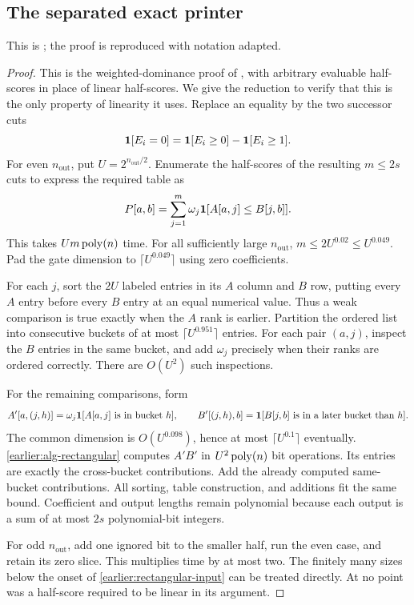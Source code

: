 \subsection{The separated exact printer}
\label{earlier:imp:printer}
This is \cite[Theorem~C.5]{Nag72}; the proof is reproduced with notation adapted.

\begin{proof}
This is the weighted-dominance proof of
\cite[Theorem~B.3]{NagCubic}, with arbitrary evaluable half-scores in
place of linear half-scores.  We give the reduction to verify that this is
the only property of linearity it uses.  Replace an equality by the two
successor cuts
\[
 \mathbf 1[E_i=0]=\mathbf 1[E_i\ge0]-\mathbf 1[E_i\ge1].
\]
For even $n_{\mathrm{out}}$, put $U=2^{n_{\mathrm{out}}/2}$.  Enumerate the half-scores of the resulting
$m\le2s$ cuts to express the required table as
\[
 P[a,b]=\sum_{j=1}^m\omega_j\mathbf 1[A[a,j]\le B[j,b]].
\]
This takes $Um\operatorname{poly}(n)$ time.  For all sufficiently large $n_{\mathrm{out}}$,
$m\le2U^{0.02}\le U^{0.049}$.  Pad the gate dimension to
$\lceil U^{0.049}\rceil$ using zero coefficients.

For each $j$, sort the $2U$ labeled entries in its $A$ column and $B$
row, putting every $A$ entry before every $B$ entry at an equal numerical
value.  Thus a weak comparison is true exactly when the $A$ rank is
earlier.  Partition the ordered list into consecutive buckets of at most
$\lceil U^{0.951}\rceil$ entries.  For each pair $(a,j)$, inspect the
$B$ entries in the same bucket, and add $\omega_j$ precisely when their
ranks are ordered correctly.  There are $O(U^2)$ such inspections.

For the remaining comparisons, form
\[
 A'[a,(j,h)]=\omega_j\mathbf 1[A[a,j]\text{ is in bucket }h],
 \qquad
 B'[(j,h),b]=\mathbf 1[B[j,b]\text{ is in a later bucket than }h].
\]
The common dimension is $O(U^{0.098})$, hence at most
$\lceil U^{0.1}\rceil$ eventually.  \cref{earlier:alg-rectangular}
computes $A'B'$ in $U^2\operatorname{poly}(n)$ bit operations.  Its entries are exactly
the cross-bucket contributions.  Add the already computed same-bucket
contributions.  All sorting, table construction, and additions fit the
same bound.  Coefficient and output lengths remain polynomial because
each output is a sum of at most $2s$ polynomial-bit integers.

For odd $n_{\mathrm{out}}$, add one ignored bit to the smaller half, run the even case,
and retain its zero slice.  This multiplies time by at most two.
The finitely many sizes below the onset of \cref{earlier:rectangular-input} can be treated directly.
At no point was a half-score required to be linear in its argument.
\end{proof}

